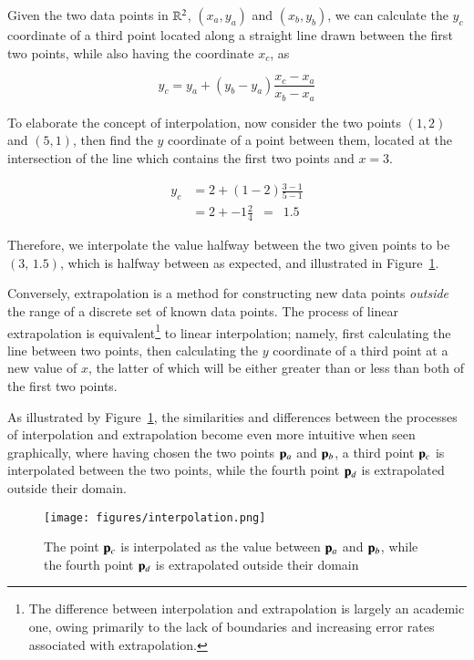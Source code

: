 Given the two data points in $\bR{2}$, $(x_a, y_a)$ and $(x_b, y_b)$, we can calculate the $y_c$ coordinate of a third point located along a straight line drawn between the first two points, while also having the coordinate $x_c$, as

\begin{equation}
	y_c = y_a + (y_b - y_a) \frac{x_c - x_a}{x_b - x_a}
	\label{eq:interpolationGeneral}
\end{equation}

To elaborate the concept of interpolation, now consider the two points $(1, 2)$ and $(5, 1)$, then find the $y$ coordinate of a point between them, located at the intersection of the line which contains the first two points and $x = 3$.

\begin{align}
	y_c & = 2 + (1 - 2) \frac{3 - 1}{5 - 1} \\
	& = 2 + -1 \frac{2}{4} \enspace = \enspace  1.5
	\label{eq:interpolationSpecific}
\end{align}

Therefore, we interpolate the value halfway between the two given points to be $(3,\,1.5)$, which is halfway between as expected, and illustrated in Figure~\ref{fig:interpolation}.

Conversely, extrapolation is a method for constructing new data points \textit{outside} the range of a discrete set of known data points. The process of linear extrapolation is equivalent\footnote{The difference between interpolation and extrapolation is largely an academic one, owing primarily to the lack of boundaries and increasing error rates associated with extrapolation.} to linear interpolation; namely, first calculating the line between two points, then calculating the $y$ coordinate of a third point at a new value of $x$, the latter of which will be either greater than or less than both of the first two points.

As illustrated by Figure~\ref{fig:interpolation}, the similarities and differences between the processes of interpolation and extrapolation become even more intuitive when seen graphically, where having chosen the two points $\mathbf{p}_a$ and $\mathbf{p}_b$, a third point $\mathbf{p}_c$ is interpolated between the two points, while the fourth point $\mathbf{p}_d$ is extrapolated outside their domain.

\begin{figure}[ht]
\ffigbox
	{\texttt{[image: figures/interpolation.png]}}
	{\caption[Interpolation and Extrapolation in $\bR{2}$]{The point $\mathbf{p}_c$ is interpolated as the value between $\mathbf{p}_a$ and $\mathbf{p}_b$, while the fourth point $\mathbf{p}_d$ is extrapolated outside their domain}\label{fig:interpolation}}
\end{figure}

